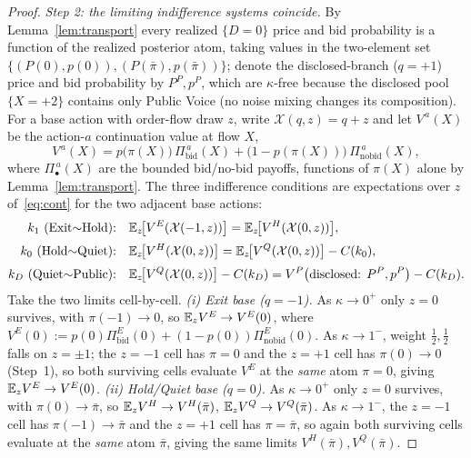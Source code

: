 \begin{proof}
\emph{Step 2: the limiting indifference systems coincide.} By
Lemma~\ref{lem:transport} every realized $\{D=0\}$ price and bid probability is a
function of the realized posterior atom, taking values in the two-element set
$\{(P(0),p(0)),(P(\bar\pi),p(\bar\pi))\}$; denote the disclosed-branch ($q=+1$)
price and bid probability by $P^{P},p^{P}$, which are $\kappa$-free because the
disclosed pool $\{X{=}{+}2\}$ contains only Public Voice (no noise mixing changes
its composition). For a base action with order-flow draw $z$, write
$\mathcal X(q,z)=q+z$ and let $V^{\,a}(X)$ be the action-$a$ continuation value at
flow $X$,
\begin{equation}\label{eq:cont}
   V^{\,a}(X)=p\bigl(\pi(X)\bigr)\,\Pi^{\,a}_{\text{bid}}(X)
             +\bigl(1-p(\pi(X))\bigr)\,\Pi^{\,a}_{\text{nobid}}(X),
\end{equation}
where $\Pi^{\,a}_{\bullet}(X)$ are the bounded bid/no-bid payoffs, functions of
$\pi(X)$ alone by Lemma~\ref{lem:transport}. The three indifference conditions are
expectations over $z$ of~\eqref{eq:cont} for the two adjacent base actions:
\begin{align}
\text{$k_1$ (Exit$\sim$Hold):}\quad
   & \mathbb{E}_z\!\bigl[V^{E}(\mathcal X(-1,z))\bigr]
   = \mathbb{E}_z\!\bigl[V^{H}(\mathcal X(0,z))\bigr],
   \label{eq:k1}\\[2pt]
\text{$k_0$ (Hold$\sim$Quiet):}\quad
   & \mathbb{E}_z\!\bigl[V^{H}(\mathcal X(0,z))\bigr]
   = \mathbb{E}_z\!\bigl[V^{Q}(\mathcal X(0,z))\bigr] - C(k_0),
   \label{eq:k0}\\[2pt]
\text{$k_D$ (Quiet$\sim$Public):}\quad
   & \mathbb{E}_z\!\bigl[V^{Q}(\mathcal X(0,z))\bigr] - C(k_D)
   = V^{P}\bigl(\text{disclosed: }P^{P},p^{P}\bigr) - C(k_D).
   \label{eq:kD}
\end{align}
Take the two limits cell-by-cell.
\emph{(i) Exit base ($q=-1$).} As $\kappa\to0^{+}$ only $z=0$ survives, with
$\pi(-1)\to0$, so $\mathbb{E}_z V^{E}\to V^{E}(0)$, where
$V^{E}(0):=p(0)\Pi^{E}_{\text{bid}}(0)+(1-p(0))\Pi^{E}_{\text{nobid}}(0)$. As
$\kappa\to1^{-}$, weight $\tfrac12,\tfrac12$ falls on $z=\pm1$; the $z=-1$ cell has
$\pi=0$ and the $z=+1$ cell has $\pi(0)\to0$ (Step~1), so both surviving cells
evaluate $V^{E}$ at the \emph{same} atom $\pi=0$, giving $\mathbb{E}_z V^{E}\to V^{E}(0)$.
\emph{(ii) Hold/Quiet base ($q=0$).} As $\kappa\to0^{+}$ only $z=0$ survives, with
$\pi(0)\to\bar\pi$, so $\mathbb{E}_z V^{H}\to V^{H}(\bar\pi)$, $\mathbb{E}_z V^{Q}\to
V^{Q}(\bar\pi)$. As $\kappa\to1^{-}$, the $z=-1$ cell has $\pi(-1)\to\bar\pi$ and
the $z=+1$ cell has $\pi=\bar\pi$, so again both surviving cells evaluate at the
\emph{same} atom $\bar\pi$, giving the same limits $V^{H}(\bar\pi),V^{Q}(\bar\pi)$.

\end{proof}
